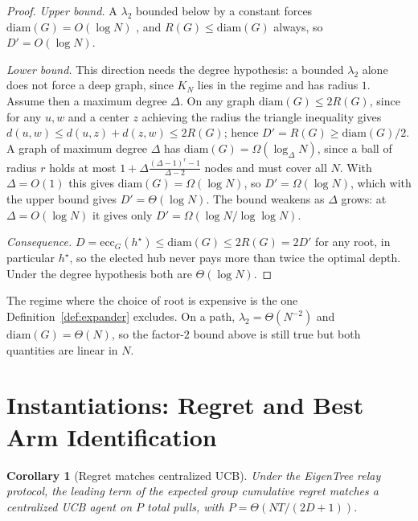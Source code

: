 \documentclass[letterpaper]{article} %
\newtheorem{corollary}{Corollary}
\begin{document}
\begin{proof}
\emph{Upper bound.} A $\lambda_2$ bounded below by a constant forces
$\mathrm{diam}(G) = O(\log N)$ \citep{mohar1991}, and $R(G)\leq
\mathrm{diam}(G)$ always, so $D' = O(\log N)$.

\emph{Lower bound.} This direction needs the degree hypothesis: a bounded
$\lambda_2$ alone does not force a deep graph, since $K_N$ lies in the regime
and has radius $1$. Assume then a maximum degree $\Delta$. On any graph
$\mathrm{diam}(G)\leq 2R(G)$, since for any $u,w$ and a center $z$ achieving
the radius the triangle inequality gives $d(u,w)\leq d(u,z)+d(z,w)\leq 2R(G)$;
hence $D'=R(G)\geq \mathrm{diam}(G)/2$. A graph of maximum degree $\Delta$ has
$\mathrm{diam}(G) = \Omega(\log_\Delta N)$, since a ball of radius $r$ holds
at most $1+\Delta\frac{(\Delta-1)^r - 1}{\Delta - 2}$ nodes and must cover all
$N$. With $\Delta = O(1)$ this gives $\mathrm{diam}(G) = \Omega(\log N)$, so
$D' = \Omega(\log N)$, which with the upper bound gives $D' = \Theta(\log N)$.
The bound weakens as $\Delta$ grows: at $\Delta = O(\log N)$ it gives only
$D' = \Omega(\log N/\log\log N)$.

\emph{Consequence.} $D = \mathrm{ecc}_G(h^\star) \leq \mathrm{diam}(G) \leq
2R(G) = 2D'$ for any root, in particular $h^\star$, so the elected hub never
pays more than twice the optimal depth. Under the degree hypothesis both are
$\Theta(\log N)$.
\end{proof}

The regime where the choice of root is expensive is the one
Definition~\ref{def:expander} excludes. On a path, $\lambda_2 = \Theta(N^{-2})$
and $\mathrm{diam}(G) = \Theta(N)$, so the factor-$2$ bound above is still
true but both quantities are linear in $N$.

\section{Instantiations: Regret and Best Arm Identification}

\begin{corollary}[Regret matches centralized UCB]
\label{cor:regret}
Under the EigenTree relay protocol, the leading term of the expected group
cumulative regret matches a centralized UCB agent on $P$ total pulls, with
$P = \Theta(NT/(2D+1))$.
\end{corollary}
\end{document}
